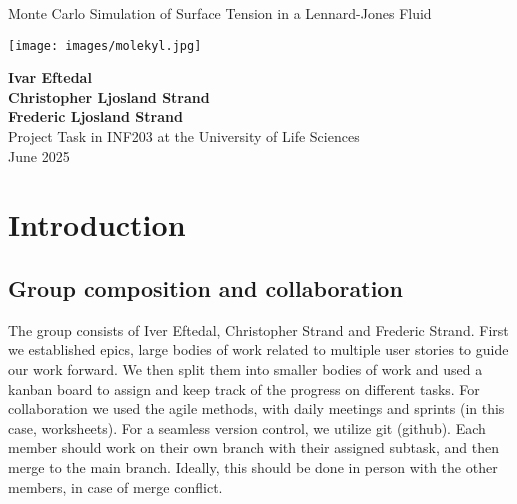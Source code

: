 \documentclass{article}
\begin{document}
\begin{titlepage}
    \centering
    
    \Huge
    \textbf{}

    \vspace{1.5cm}
    \LARGE
    Monte Carlo Simulation of Surface Tension in a Lennard-Jones Fluid

    \vspace{1.5cm}

    \texttt{[image: images/molekyl.jpg]}\\[1cm]
    \cite{uh_methanediol_2021}
    \vfill

    \Large
    \textbf{Ivar Eftedal}\\
    \textbf{Christopher Ljosland Strand}\\
    \textbf{Frederic Ljosland Strand}\\
    \vspace{0.5cm}
    Project Task in INF203 at the University of Life Sciences\\
    \vspace{0.5cm}
    June 2025\\

    \vspace{1cm}

\end{titlepage}

\section{Introduction}

\subsection*{Group composition and collaboration}

The group consists of Iver Eftedal, Christopher Strand and Frederic Strand. First we established epics, large bodies of work related to multiple user stories to guide our work forward. We then split them into smaller bodies of work and used a kanban board to assign and keep track of the progress on different tasks. For collaboration we used the agile methods, with daily meetings and sprints (in this case, worksheets). For a seamless version control, we utilize git (github). Each member should work on their own branch with their assigned subtask, and then merge to the main branch. Ideally, this should be done in person with the other members, in case of merge conflict. 
\end{document}
